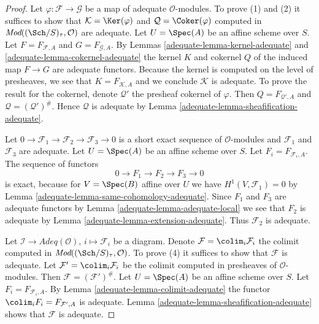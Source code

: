 \begin{proof}

Let $\varphi : \mathcal{F} \to \mathcal{G}$ be a map of adequate
$\mathcal{O}$-modules. To prove (1) and (2) it suffices to show that
$\mathcal{K} = \Ker(\varphi)$ and
$\mathcal{Q} = \Coker(\varphi)$ computed in
$\textit{Mod}((\Sch/S)_\tau, \mathcal{O})$ are adequate.
Let $U = \Spec(A)$ be an affine scheme over $S$.
Let $F = F_{\mathcal{F}, A}$ and $G = F_{\mathcal{G}, A}$.
By
Lemmas \ref{adequate-lemma-kernel-adequate} and
\ref{adequate-lemma-cokernel-adequate}
the kernel $K$ and cokernel $Q$ of the induced map
$F \to G$ are adequate functors.
Because the kernel is computed on the level of presheaves, we see
that $K = F_{\mathcal{K}, A}$ and we conclude $\mathcal{K}$ is adequate.
To prove the result for the cokernel, denote $\mathcal{Q}'$ the presheaf
cokernel of $\varphi$. Then $Q = F_{\mathcal{Q}', A}$ and
$\mathcal{Q} = (\mathcal{Q}')^\#$. Hence $\mathcal{Q}$
is adequate by
Lemma \ref{adequate-lemma-sheafification-adequate}.

\medskip\noindent
Let $0 \to \mathcal{F}_1 \to \mathcal{F}_2 \to \mathcal{F}_3 \to 0$
is a short exact sequence of $\mathcal{O}$-modules and
$\mathcal{F}_1$ and $\mathcal{F}_3$ are adequate.
Let $U = \Spec(A)$ be an affine scheme over $S$.
Let $F_i = F_{\mathcal{F}_i, A}$. The sequence of functors
$$
0 \to F_1 \to F_2 \to F_3 \to 0
$$
is exact, because for $V = \Spec(B)$ affine over $U$ we have
$H^1(V, \mathcal{F}_1) = 0$ by
Lemma \ref{adequate-lemma-same-cohomology-adequate}.
Since $F_1$ and $F_3$ are adequate functors by
Lemma \ref{adequate-lemma-adequate-local}
we see that $F_2$ is adequate by
Lemma \ref{adequate-lemma-extension-adequate}.
Thus $\mathcal{F}_2$ is adequate.

\medskip\noindent
Let $\mathcal{I} \to \textit{Adeq}(\mathcal{O})$, $i \mapsto \mathcal{F}_i$
be a diagram. Denote $\mathcal{F} = \colim_i \mathcal{F}_i$
the colimit computed in
$\textit{Mod}((\Sch/S)_\tau, \mathcal{O})$.
To prove (4) it suffices to show that $\mathcal{F}$ is adequate.
Let $\mathcal{F}' = \colim_i \mathcal{F}_i$ be the colimit computed
in presheaves of $\mathcal{O}$-modules. Then
$\mathcal{F} = (\mathcal{F}')^\#$.
Let $U = \Spec(A)$ be an affine scheme over $S$.
Let $F_i = F_{\mathcal{F}_i, A}$. By
Lemma \ref{adequate-lemma-colimit-adequate}
the functor $\colim_i F_i = F_{\mathcal{F}', A}$ is adequate.
Lemma \ref{adequate-lemma-sheafification-adequate}
shows that $\mathcal{F}$ is adequate.
\end{proof}


